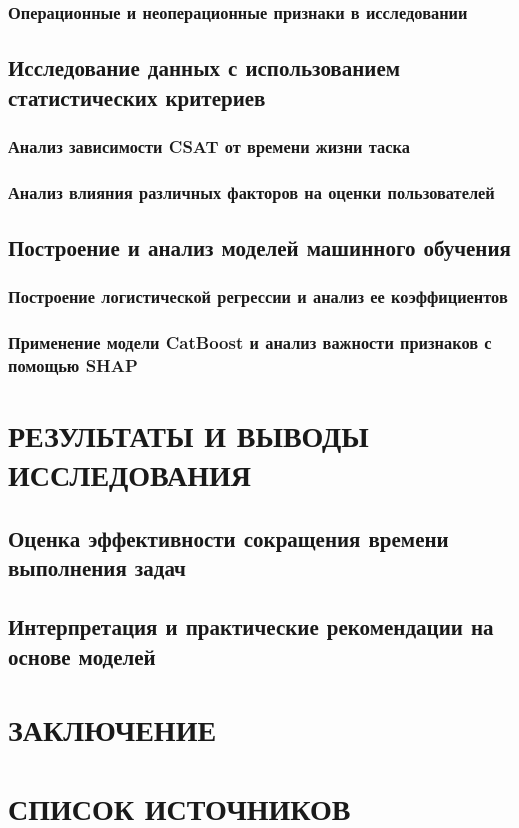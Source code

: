 \documentclass[a4paper,12pt]{article}
\begin{document}
\subsubsection{Операционные и неоперационные признаки в исследовании}

\subsection{Исследование данных с использованием статистических критериев}
\subsubsection{Анализ зависимости CSAT от времени жизни таска}
\subsubsection{Анализ влияния различных факторов на оценки пользователей}

\subsection{Построение и анализ моделей машинного обучения}
\subsubsection{Построение логистической регрессии и анализ ее коэффициентов}
\subsubsection{Применение модели CatBoost и анализ важности признаков с помощью SHAP}

\section{РЕЗУЛЬТАТЫ И ВЫВОДЫ ИССЛЕДОВАНИЯ}
\subsection{Оценка эффективности сокращения времени выполнения задач}
\subsection{Интерпретация и практические рекомендации на основе моделей}

\section*{ЗАКЛЮЧЕНИЕ}
\section*{СПИСОК ИСТОЧНИКОВ}
\end{document}
